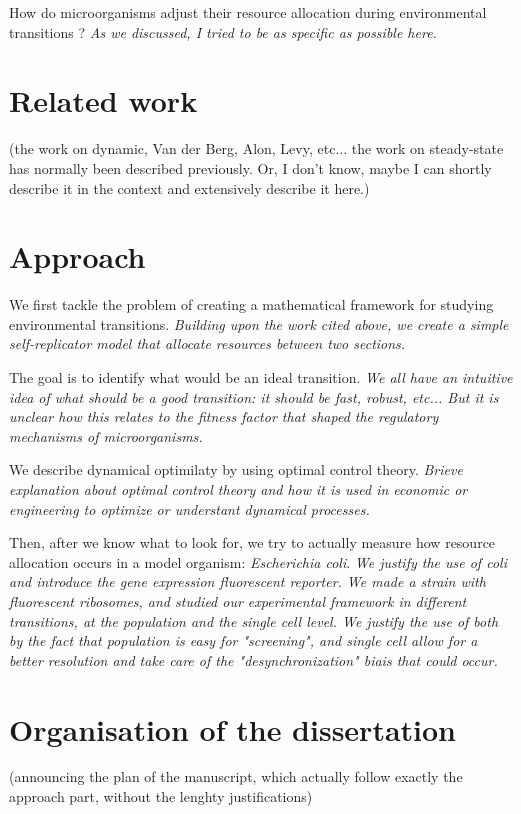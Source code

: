 How do microorganisms adjust their resource allocation during environmental transitions ?
\textit{As we discussed, I tried to be as specific as possible here.}

\section{Related work}

(the work on dynamic, Van der Berg, Alon, Levy, etc... the work on steady-state has normally been described previously. Or, I don't know, maybe I can shortly describe it in the context and extensively describe it here.)

\section{Approach}

We first tackle the problem of creating a mathematical framework for studying environmental transitions.
\textit{Building upon the work cited above, we create a simple self-replicator model that allocate resources between two sections.}

The goal is to identify what would be an ideal transition.
\textit{We all have an intuitive idea of what should be a good transition: it should be fast, robust, etc... But it is unclear how this relates to the fitness factor that shaped the regulatory mechanisms of microorganisms.}

We describe dynamical optimilaty by using optimal control theory.
\textit{Brieve explanation about optimal control theory and how it is used in economic or engineering to optimize or understant dynamical processes.}

Then, after we know what to look for, we try to actually measure how resource allocation occurs in a model organism: \textit{Escherichia coli}.
\textit{We justify the use of coli and introduce the gene expression fluorescent reporter.
We made a strain with fluorescent ribosomes, and studied our experimental framework in different transitions, at the population and the single cell level.
We justify the use of both by the fact that population is easy for "screening", and single cell allow for a better resolution and take care of the "desynchronization" biais that could occur.}

\section{Organisation of the dissertation}

(announcing the plan of the manuscript, which actually follow exactly the approach part, without the lenghty justifications)